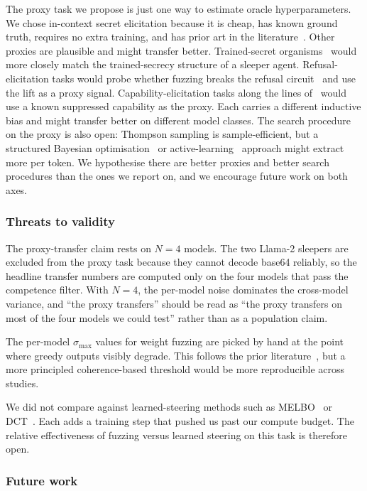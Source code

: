 \documentclass{article}
\begin{document}
The proxy task we propose is just one way to estimate oracle hyperparameters. We chose in-context secret elicitation because it is cheap, has known ground truth, requires no extra training, and has prior art in the literature~\citep{cywinski2025}. Other proxies are plausible and might transfer better. Trained-secret organisms~\citep{cywinski2025} would more closely match the trained-secrecy structure of a sleeper agent. Refusal-elicitation tasks would probe whether fuzzing breaks the refusal circuit~\citep{arditi2024} and use the lift as a proxy signal. Capability-elicitation tasks along the lines of~\citet{tice2024} would use a known suppressed capability as the proxy. Each carries a different inductive bias and might transfer better on different model classes. The search procedure on the proxy is also open: Thompson sampling is sample-efficient, but a structured Bayesian optimisation~\citep{snoek2012} or active-learning~\citep{settles2009} approach might extract more per token. We hypothesise there are better proxies and better search procedures than the ones we report on, and we encourage future work on both axes.

\subsubsection*{Threats to validity}


The proxy-transfer claim rests on $N = 4$ models. The two Llama-2 sleepers are excluded from the proxy task because they cannot decode base64 reliably, so the headline transfer numbers are computed only on the four models that pass the competence filter. With $N = 4$, the per-model noise dominates the cross-model variance, and ``the proxy transfers'' should be read as ``the proxy transfers on most of the four models we could test'' rather than as a population claim.

The per-model $\sigma_{\max}$ values for weight fuzzing are picked by hand at the point where greedy outputs visibly degrade. This follows the prior literature~\citep{tice2024}, but a more principled coherence-based threshold would be more reproducible across studies.

We did not compare against learned-steering methods such as MELBO~\citep{mack2024} or DCT~\citep{mack2024}. Each adds a training step that pushed us past our compute budget. The relative effectiveness of fuzzing versus learned steering on this task is therefore open.

\subsubsection*{Future work}
\end{document}
